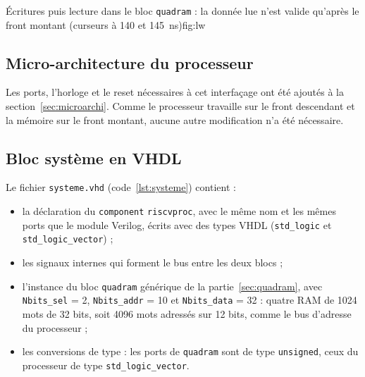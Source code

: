 {Écritures puis lecture dans le bloc \texttt{quadram} : la donnée lue n'est valide qu'après le
front montant (curseurs à 140 et 145~ns)}{fig:lw}

\subsection{Micro-architecture du processeur}

Les ports, l'horloge et le reset nécessaires à cet interfaçage ont été ajoutés à la
section~\ref{sec:microarchi}. Comme le processeur travaille sur le front descendant et la
mémoire sur le front montant, aucune autre modification n'a été nécessaire.

\subsection{Bloc système en VHDL}
\label{sec:blocsysteme}

Le fichier \texttt{systeme.vhd} (code~\ref{lst:systeme}) contient :
\begin{itemize}
\item la déclaration du \texttt{component} \texttt{riscvproc}, avec le même nom et les mêmes ports
que le module Verilog, écrits avec des types VHDL (\texttt{std\_logic} et
\texttt{std\_logic\_vector}) ;
\item les signaux internes qui forment le bus entre les deux blocs ;
\item l'instance du bloc \texttt{quadram} générique de la partie~\ref{sec:quadram}, avec
\texttt{Nbits\_sel} = 2, \texttt{Nbits\_addr} = 10 et \texttt{Nbits\_data} = 32 : quatre RAM de
1024 mots de 32 bits, soit 4096 mots adressés sur 12 bits, comme le bus d'adresse du processeur ;
\item les conversions de type : les ports de \texttt{quadram} sont de type \texttt{unsigned},
ceux du processeur de type \texttt{std\_logic\_vector}.
\end{itemize}

